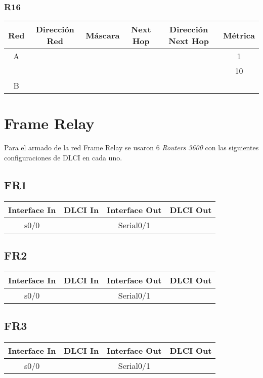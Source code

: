\documentclass[12pt, a4paper, spanish]{article}
\begin{document}
\subsubsection{R16}
\begin{center}
\begin{tabular}{|c|c|c|c|c|c|}
	\hline
	Red & Dirección Red & Máscara & Next Hop & Dirección Next Hop & Métrica \\
	\hline
	\hline
	A &  &  &  &  & 1\\
 	  &  &  &  &  & 10 \\
	\hline	
	B & & & & &\\
	\hline
\end{tabular}
\end{center}

\newpage
\section{Frame Relay}
Para el armado de la red Frame Relay se usaron 6 \emph{Routers 3600}
con las siguientes configuraciones de DLCI en cada uno.
\subsection{FR1}
\begin{tabular}{|c|c|c|c|}
\hline
Interface In & DLCI In & Interface Out & DLCI Out \\
\hline
\hline
 s0/0 &  & Serial0/1 &  \\
\hline
\end{tabular}

\subsection{FR2}
\begin{tabular}{|c|c|c|c|}
\hline
Interface In & DLCI In & Interface Out & DLCI Out \\
\hline
\hline
 s0/0 &  & Serial0/1 &  \\
\hline
\end{tabular}

\subsection{FR3}
\begin{tabular}{|c|c|c|c|}
\hline
Interface In & DLCI In & Interface Out & DLCI Out \\
\hline
\hline
 s0/0 &  & Serial0/1 &  \\
\hline
\end{tabular}
\end{document}
